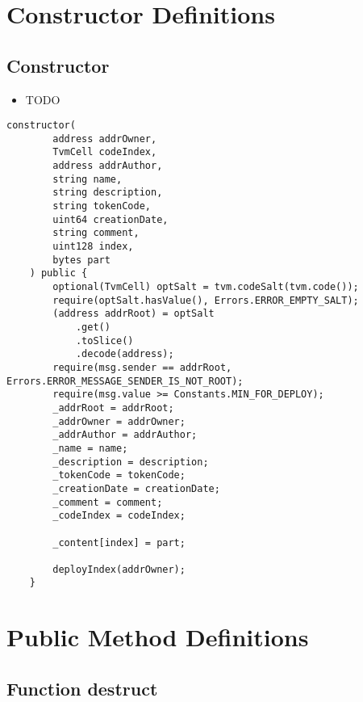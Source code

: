 \section{Constructor Definitions}


\subsection{Constructor}

\begin{itemize}
\item TODO
\end{itemize}

\begin{lstlisting}[firstnumber=28]
    constructor(
        address addrOwner,
        TvmCell codeIndex,
        address addrAuthor,
        string name,
        string description,
        string tokenCode,
        uint64 creationDate,
        string comment,
        uint128 index,
        bytes part
    ) public {
        optional(TvmCell) optSalt = tvm.codeSalt(tvm.code());
        require(optSalt.hasValue(), Errors.ERROR_EMPTY_SALT);
        (address addrRoot) = optSalt
            .get()
            .toSlice()
            .decode(address);
        require(msg.sender == addrRoot, Errors.ERROR_MESSAGE_SENDER_IS_NOT_ROOT);
        require(msg.value >= Constants.MIN_FOR_DEPLOY);
        _addrRoot = addrRoot;
        _addrOwner = addrOwner;
        _addrAuthor = addrAuthor;
        _name = name;
        _description = description;
        _tokenCode = tokenCode;
        _creationDate = creationDate;
        _comment = comment;
        _codeIndex = codeIndex;

        _content[index] = part;

        deployIndex(addrOwner);
    }
\end{lstlisting}

\section{Public Method Definitions}


\subsection{Function destruct}

